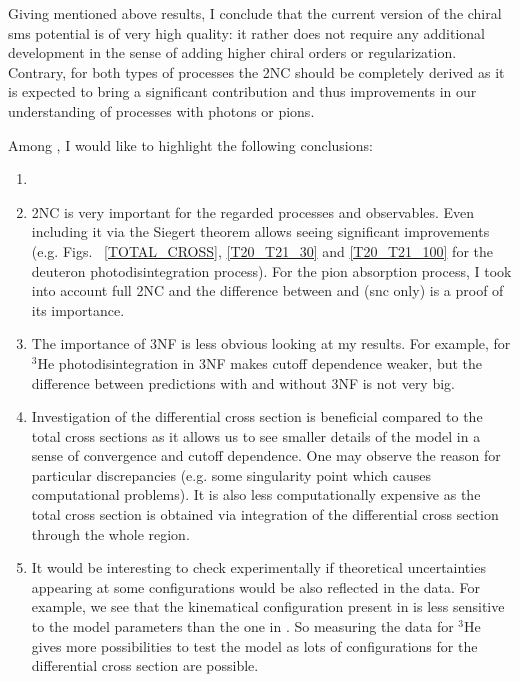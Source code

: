 Giving mentioned above results, I conclude that the current version of 
the chiral \gls{sms} potential is of very high quality:
it rather does not require any additional development in the sense of adding higher chiral orders or regularization.
Contrary, for both types of processes the 2NC should be completely derived as it is expected to bring 
a significant contribution and thus improvements in our understanding of processes
with photons or pions.

Among , I would like to highlight the following 
conclusions:

\begin{enumerate}
    \item {}
    \item 2NC is very important for the regarded processes and observables. Even including it via the Siegert theorem allows seeing significant improvements (e.g. Figs.~ \ref{TOTAL_CROSS}, \ref{T20_T21_30} and \ref{T20_T21_100} for the deuteron photodisintegration process). For the pion absorption process, I took into account full 2NC and the difference between  and  (\gls{snc} only) is a proof of its importance.
    \item The importance of 3NF is less obvious looking at my results. For example, for $^3$He photodisintegration in  3NF makes cutoff dependence weaker, but the difference between predictions with and without 3NF is not very big.
    \item Investigation of the differential cross section is beneficial compared to the total cross sections as it allows us to see smaller details of the model in a sense of convergence and cutoff dependence. One may observe the reason for particular discrepancies (e.g. some singularity point which causes computational problems). It is also less computationally expensive as the total cross section is obtained via integration of the differential cross section through the whole region.
    \item It would be interesting to check experimentally if theoretical uncertainties appearing at some configurations would be also reflected in the data. For example, we see that the kinematical configuration present in  is less sensitive to the model parameters than the one in . So measuring the data for $^3$He gives more possibilities to test the model as lots of configurations for the differential cross section are possible.

\end{enumerate}
